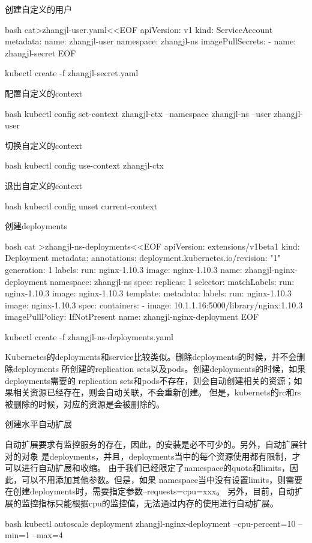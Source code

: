 \begin{outline}[enumerate]
\1 创建自定义的用户
\begin{code-block}{bash}
cat>zhangjl-user.yaml<<EOF
apiVersion: v1
kind: ServiceAccount
metadata:
  name: zhangjl-user
  namespace: zhangjl-ns
imagePullSecrets:
- name: zhangjl-secret
EOF

kubectl create -f zhangjl-secret.yaml
\end{code-block}

\1 配置自定义的context
\begin{code-block}{bash}
kubectl config set-context zhangjl-ctx --namespace zhangjl-ns --user zhangjl-user
\end{code-block}

\1 切换自定义的context
\begin{code-block}{bash}
kubectl config use-context zhangjl-ctx
\end{code-block}

\1 退出自定义的context
\begin{code-block}{bash}
kubectl config unset current-context
\end{code-block}

\1 创建deployments
\begin{code-block}{bash}
cat >zhangjl-ns-deployments<<EOF
apiVersion: extensions/v1beta1
kind: Deployment
metadata:
  annotations:
    deployment.kubernetes.io/revision: "1"
  generation: 1
  labels:
    run: nginx-1.10.3
    image: nginx-1.10.3
  name: zhangjl-nginx-deployment
  namespace: zhangjl-ns
spec:
  replicas: 1
  selector:
    matchLabels:
      run: nginx-1.10.3
      image: nginx-1.10.3
  template:
    metadata:
      labels:
        run: nginx-1.10.3
        image: nginx-1.10.3
    spec:
      containers:
      - image: 10.1.1.16:5000/library/nginx:1.10.3
        imagePullPolicy: IfNotPresent
        name: zhangjl-nginx-deployment
EOF

kubectl create -f zhangjl-ns-deployments.yaml
\end{code-block}
Kubernetes的deployments和service比较类似。删除deployments的时候，并不会删除deployments
所创建的replication sets以及pods。创建deployments的时候，如果deployments需要的
replication sets和pods不存在，则会自动创建相关的资源；如果相关资源已经存在，则会自动关联，不会重新创建。
但是，kubernets的rc和rs被删除的时候，对应的资源是会被删除的。

\1 创建水平自动扩展

自动扩展要求有监控服务的存在，因此，的安装是必不可少的。另外，自动扩展针对的对象
是deployments，并且，deployments当中的每个资源使用都有限制，才可以进行自动扩展和收缩。
由于我们已经限定了namespace的quota和limits，因此，可以不用添加其他参数。但是，如果
namespace当中没有设置limits，则需要在创建deployments时，需要指定参数--requests=cpu=xxx。
另外，目前，自动扩展的监控指标只能根据cpu的监控值，无法通过内存的使用进行自动扩展。
\begin{code-block}{bash}
kubectl autoscale deployment zhangjl-nginx-deployment --cpu-percent=10 --min=1 --max=4


\end{code-block}
\end{outline}
